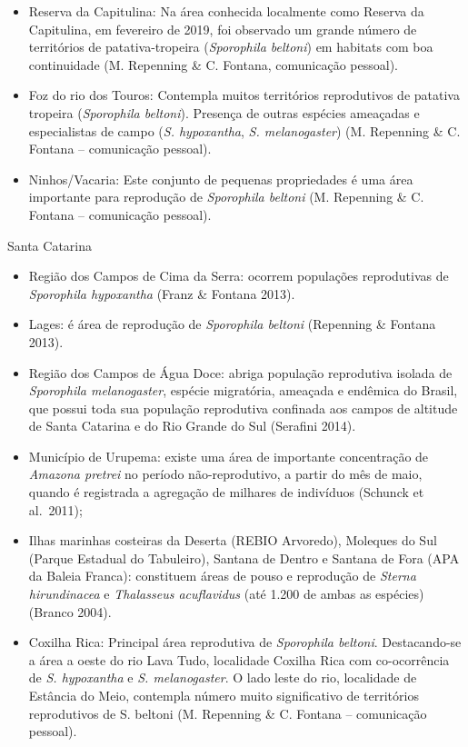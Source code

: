 \documentclass[
]{scrbook}
\begin{document}
\begin{itemize}
\item
  Reserva da Capitulina: Na área conhecida localmente como Reserva da Capitulina, em fevereiro de 2019, foi observado um grande número de territórios de patativa-tropeira (\emph{Sporophila beltoni}) em habitats com boa continuidade (M. Repenning \& C. Fontana, comunicação pessoal).
\item
  Foz do rio dos Touros: Contempla muitos territórios reprodutivos de patativa tropeira (\emph{Sporophila beltoni}). Presença de outras espécies ameaçadas e especialistas de campo (\emph{S. hypoxantha}, \emph{S. melanogaster}) (M. Repenning \& C. Fontana -- comunicação pessoal).
\item
  Ninhos/Vacaria: Este conjunto de pequenas propriedades é uma área importante para reprodução de \emph{Sporophila beltoni} (M. Repenning \& C. Fontana -- comunicação pessoal).
\end{itemize}

Santa Catarina

\begin{itemize}
\item
  Região dos Campos de Cima da Serra: ocorrem populações reprodutivas de \emph{Sporophila hypoxantha} (Franz \& Fontana 2013).
\item
  Lages: é área de reprodução de \emph{Sporophila beltoni} (Repenning \& Fontana 2013).
\item
  Região dos Campos de Água Doce: abriga população reprodutiva isolada de \emph{Sporophila melanogaster}, espécie migratória, ameaçada e endêmica do Brasil, que possui toda sua população reprodutiva confinada aos campos de altitude de Santa Catarina e do Rio Grande do Sul (Serafini 2014).
\item
  Município de Urupema: existe uma área de importante concentração de \emph{Amazona pretrei} no período não-reprodutivo, a partir do mês de maio, quando é registrada a agregação de milhares de indivíduos (Schunck et al.~2011);
\item
  Ilhas marinhas costeiras da Deserta (REBIO Arvoredo), Moleques do Sul (Parque Estadual do Tabuleiro), Santana de Dentro e Santana de Fora (APA da Baleia Franca): constituem áreas de pouso e reprodução de \emph{Sterna hirundinacea} e \emph{Thalasseus acuflavidus} (até 1.200 de ambas as espécies) (Branco 2004).
\item
  Coxilha Rica: Principal área reprodutiva de \emph{Sporophila beltoni}. Destacando-se a área a oeste do rio Lava Tudo, localidade Coxilha Rica com co-ocorrência de \emph{S. hypoxantha} e \emph{S. melanogaster}. O lado leste do rio, localidade de Estância do Meio, contempla número muito significativo de territórios reprodutivos de S. beltoni (M. Repenning \& C. Fontana -- comunicação pessoal).
\end{itemize}
\end{document}
